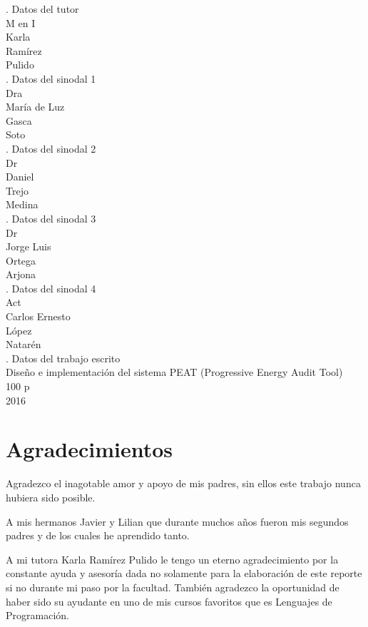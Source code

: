 \documentclass[letterpaper,twoside,openright]{book}
\begin{document}
. Datos del tutor\\
M en I\\
Karla\\
Ramírez\\
Pulido\\

. Datos del sinodal 1\\
Dra\\
María de Luz\\
Gasca\\
Soto\\

. Datos del sinodal 2\\
Dr\\
Daniel\\
Trejo\\
Medina\\

. Datos del sinodal 3\\
Dr\\
Jorge Luis\\
Ortega\\
Arjona\\

. Datos del sinodal 4\\
Act\\
Carlos Ernesto\\
López\\
Natarén\\

. Datos del trabajo escrito\\
Diseño e implementación del sistema PEAT (Progressive Energy Audit Tool)\\
100 p\\
2016\\


\chapter*{Agradecimientos}

Agradezco el inagotable amor y apoyo de mis padres, sin ellos este trabajo
nunca hubiera sido posible.

A mis hermanos Javier y Lilian que durante muchos años fueron mis segundos padres
y de los cuales he aprendido tanto.

A mi tutora Karla Ramírez Pulido le tengo un eterno agradecimiento por la constante
ayuda y asesoría dada no solamente para la elaboración de este reporte si no durante
mi paso por la facultad. También agradezco la oportunidad de haber sido su ayudante
en uno de mis cursos favoritos que es Lenguajes de Programación.
\end{document}
